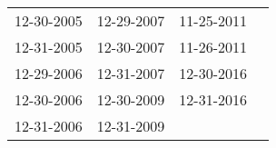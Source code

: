 \begin{supertabular}{llll}
 12-30-2005 &  12-29-2007 &  11-25-2011 \\
 12-31-2005 &  12-30-2007 &  11-26-2011 \\
 12-29-2006 &  12-31-2007 &  12-30-2016 \\
 12-30-2006 &  12-30-2009 &  12-31-2016 \\
 12-31-2006 &  12-31-2009 &             \\
\end{supertabular}
